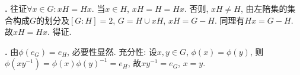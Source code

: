 \par \textbf{\thesolgrp .} 往证$\forall x\in G: xH=Hx$. 当$x\in H$, $xH=H=Hx$. 否则, $xH\neq H$, 由左陪集的集合构成$G$的划分及$[G:H]=2$, $G=H \cup xH$, $xH = G-H$. 同理有$Hx = G-H$. 故$xH=Hx$. 得证. 

\par \textbf{\thesolgrp .} 由$\phi(e_G)=e_H$, 必要性显然. 充分性: 设$x,y\in G$, $\phi(x)=\phi(y)$, 则$\phi(xy^{-1})=\phi(x)\phi(y)^{-1}=e_H$, 故$xy^{-1}=e_G$, $x=y$.


